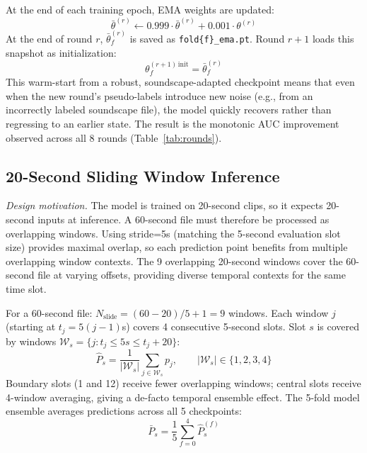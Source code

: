 \documentclass[journal]{IEEEtran}
\begin{document}
At the end of each training epoch, EMA weights are updated:
\begin{equation}
  \bar{\theta}^{(r)} \leftarrow 0.999 \cdot \bar{\theta}^{(r)} + 0.001 \cdot \theta^{(r)}
\end{equation}
At the end of round $r$, $\bar{\theta}_f^{(r)}$ is saved as \texttt{fold\{f\}\_ema.pt}.
Round $r+1$ loads this snapshot as initialization:
\begin{equation}
  \theta_f^{(r+1)\,\text{init}} = \bar{\theta}_f^{(r)}
\end{equation}
This warm-start from a robust, soundscape-adapted checkpoint means that even when the new round's pseudo-labels introduce new noise (e.g., from an incorrectly labeled soundscape file), the model quickly recovers rather than regressing to an earlier state.
The result is the monotonic AUC improvement observed across all 8 rounds (Table~\ref{tab:rounds}).

\subsection{20-Second Sliding Window Inference}

\emph{Design motivation.}
The model is trained on 20-second clips, so it expects 20-second inputs at inference.
A 60-second file must therefore be processed as overlapping windows.
Using stride=5s (matching the 5-second evaluation slot size) provides maximal overlap, so each prediction point benefits from multiple overlapping window contexts.
The 9 overlapping 20-second windows cover the 60-second file at varying offsets, providing diverse temporal contexts for the same time slot.

For a 60-second file: $N_\text{slide} = (60-20)/5 + 1 = 9$ windows.
Each window $j$ (starting at $t_j = 5(j-1)$s) covers 4 consecutive 5-second slots.
Slot $s$ is covered by windows $\mathcal{W}_s = \{j : t_j \leq 5s \leq t_j+20\}$:
\begin{equation}
  \hat{P}_s = \frac{1}{|\mathcal{W}_s|}\sum_{j \in \mathcal{W}_s} p_j, \qquad |\mathcal{W}_s| \in \{1, 2, 3, 4\}
\end{equation}
Boundary slots (1 and 12) receive fewer overlapping windows; central slots receive 4-window averaging, giving a de-facto temporal ensemble effect.
The 5-fold model ensemble averages predictions across all 5 checkpoints:
\begin{equation}
  \bar{P}_s = \frac{1}{5}\sum_{f=0}^{4}\hat{P}_s^{(f)}
\end{equation}
\end{document}
